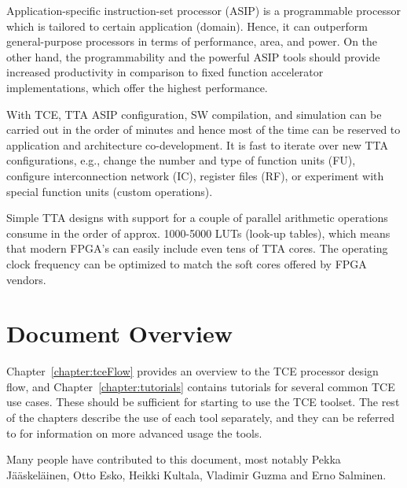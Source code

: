 \documentclass[twoside]{tceusermanual}
\begin{document}
Application-specific instruction-set processor (ASIP) is a
programmable processor which is tailored to certain application
(domain). Hence, it can outperform general-purpose processors in terms
of performance, area, and power. On the other hand, the programmability
and the powerful ASIP tools should provide increased productivity in
comparison to fixed function accelerator implementations, which offer the
highest performance.

With TCE, TTA ASIP configuration, SW compilation, and simulation can
be carried out in the order of minutes and hence most of the time can
be reserved to application and architecture co-development. It is fast
to iterate over new TTA configurations, e.g., change the number and
type of function units (FU), configure interconnection network (IC),
register files (RF), or experiment with special function units
(custom operations). 

Simple TTA designs with support for a couple of
parallel arithmetic operations consume in the order of
approx. 1000-5000 LUTs (look-up tables), which means that modern FPGA's
can easily include even tens of TTA cores. The operating clock frequency can
be optimized to match the soft cores offered by FPGA vendors.

\section{Document Overview}

Chapter~\ref{chapter:tceFlow} provides an overview to the TCE
processor design flow, and Chapter~\ref{chapter:tutorials} contains
tutorials for several common TCE use cases. These should be sufficient
for starting to use the TCE toolset.  The rest of the chapters
describe the use of each tool separately, and they can be referred to
for information on more advanced usage the tools.

Many people have contributed to this document, most notably Pekka
Jääskeläinen, Otto Esko, Heikki Kultala, Vladimir Guzma and Erno
Salminen.
\end{document}
